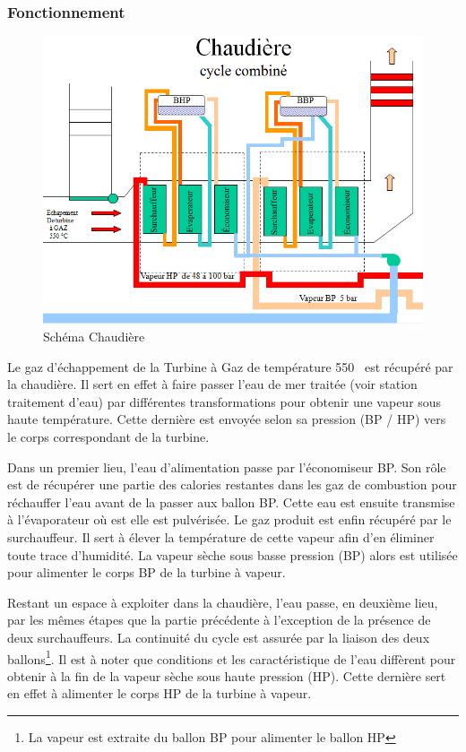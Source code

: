 \subsubsection{Fonctionnement}
\begin{figure}[hbtp]
\centering
\includegraphics[scale=0.7]{./Figures/chaudiere_fonctionnement.png}
\caption{Schéma Chaudière }
\end{figure}
Le gaz d'échappement de la Turbine à Gaz de température 550 \textcelsius\ est récupéré par la chaudière. Il sert en effet à faire passer l'eau de mer traitée (voir station traitement d'eau) par différentes transformations pour obtenir une vapeur sous haute température. Cette dernière est envoyée selon sa pression (BP / HP) vers le corps correspondant de la turbine.

Dans un premier lieu, l'eau d'alimentation passe par l'économiseur BP. Son rôle est de récupérer une partie des calories restantes dans les gaz de combustion pour réchauffer l'eau avant de la passer aux ballon BP. Cette eau est ensuite transmise à l'évaporateur où est elle est pulvérisée. Le gaz produit est enfin récupéré par le surchauffeur. Il sert à élever la température de cette vapeur   afin d'en éliminer toute trace d'humidité. La vapeur sèche sous basse pression (BP) alors  est utilisée pour alimenter le corps BP de la turbine à vapeur.

Restant un  espace à exploiter dans la chaudière, l'eau passe, en deuxième lieu, par les mêmes étapes  que la partie précédente à l'exception de la présence de deux surchauffeurs. La continuité du cycle est assurée par la liaison des deux ballons\footnote{La vapeur est extraite du ballon BP pour alimenter le ballon HP}. Il est  à noter que conditions et les caractéristique de l'eau diffèrent pour obtenir à la fin de la vapeur sèche sous haute pression (HP). Cette dernière sert en effet à alimenter le corps HP de la turbine à vapeur.
